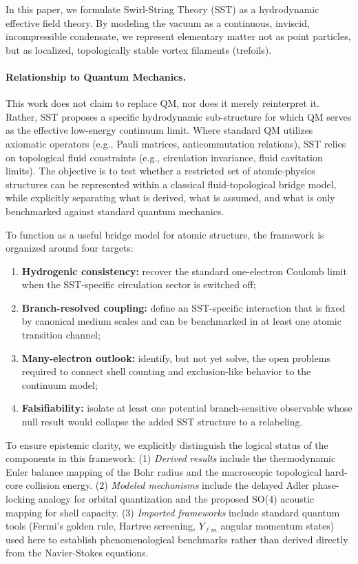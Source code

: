 \documentclass[11pt,a4paper]{article}
\begin{document}
        In this paper, we formulate Swirl-String Theory (SST) as a hydrodynamic effective field theory. By modeling the vacuum as a continuous, inviscid, incompressible condensate, we represent elementary matter not as point particles, but as localized, topologically stable vortex filaments (trefoils).
        
        \paragraph{Relationship to Quantum Mechanics.} This work does not claim to replace QM, nor does it merely reinterpret it. Rather, SST proposes a specific hydrodynamic sub-structure for which QM serves as the effective low-energy continuum limit. Where standard QM utilizes axiomatic operators (e.g., Pauli matrices, anticommutation relations), SST relies on topological fluid constraints (e.g., circulation invariance, fluid cavitation limits). The objective is to test whether a restricted set of atomic-physics structures can be represented within a classical fluid-topological bridge model, while explicitly separating what is derived, what is assumed, and what is only benchmarked against standard quantum mechanics.
        
        To function as a useful bridge model for atomic structure, the framework is organized around four targets:
        \begin{enumerate}[label=(C\arabic*)]
            \item \textbf{Hydrogenic consistency:} recover the standard one-electron Coulomb limit when the SST-specific circulation sector is switched off;
            \item \textbf{Branch-resolved coupling:} define an SST-specific interaction that is fixed by canonical medium scales and can be benchmarked in at least one atomic transition channel;
            \item \textbf{Many-electron outlook:} identify, but not yet solve, the open problems required to connect shell counting and exclusion-like behavior to the continuum model;
            \item \textbf{Falsifiability:} isolate at least one potential branch-sensitive observable whose null result would collapse the added SST structure to a relabeling.
        \end{enumerate}
        
        To ensure epistemic clarity, we explicitly distinguish the logical status of the components in this framework: (1) \emph{Derived results} include the thermodynamic Euler balance mapping of the Bohr radius and the macroscopic topological hard-core collision energy. (2) \emph{Modeled mechanisms} include the delayed Adler phase-locking analogy for orbital quantization and the proposed SO(4) acoustic mapping for shell capacity. (3) \emph{Imported frameworks} include standard quantum tools (Fermi's golden rule, Hartree screening, $Y_{\ell m}$ angular momentum states) used here to establish phenomenological benchmarks rather than derived directly from the Navier-Stokes equations.
    
\end{document}
